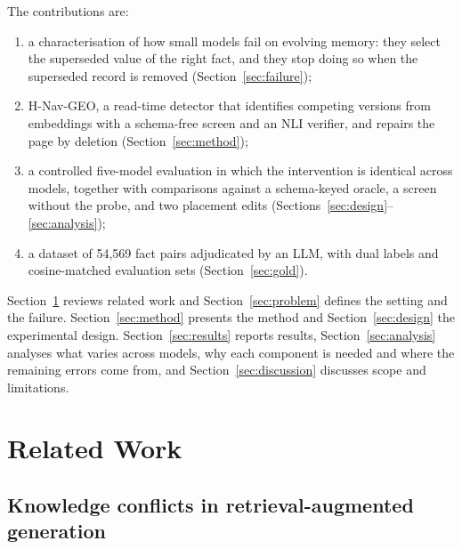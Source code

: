 \documentclass[journal=jcisd8,manuscript=article]{achemso}
\newcommand{\geo}{H-Nav-GEO}
\begin{document}
The contributions are:
\begin{enumerate}
  \item a characterisation of how small models fail on evolving memory: they select the superseded value of the right fact, and they stop doing so when the superseded record is removed (Section~\ref{sec:failure});
  \item \geo{}, a read-time detector that identifies competing versions from embeddings with a schema-free screen and an NLI verifier, and repairs the page by deletion (Section~\ref{sec:method});
  \item a controlled five-model evaluation in which the intervention is identical across models, together with comparisons against a schema-keyed oracle, a screen without the probe, and two placement edits (Sections~\ref{sec:design}--\ref{sec:analysis});
  \item a dataset of 54,569 fact pairs adjudicated by an LLM, with dual labels and cosine-matched evaluation sets (Section~\ref{sec:gold}).
\end{enumerate}

Section~\ref{sec:related} reviews related work and Section~\ref{sec:problem} defines the setting and the failure. Section~\ref{sec:method} presents the method and Section~\ref{sec:design} the experimental design. Section~\ref{sec:results} reports results, Section~\ref{sec:analysis} analyses what varies across models, why each component is needed and where the remaining errors come from, and Section~\ref{sec:discussion} discusses scope and limitations.

\section{Related Work}
\label{sec:related}

\subsection{Knowledge conflicts in retrieval-augmented generation}
\end{document}
